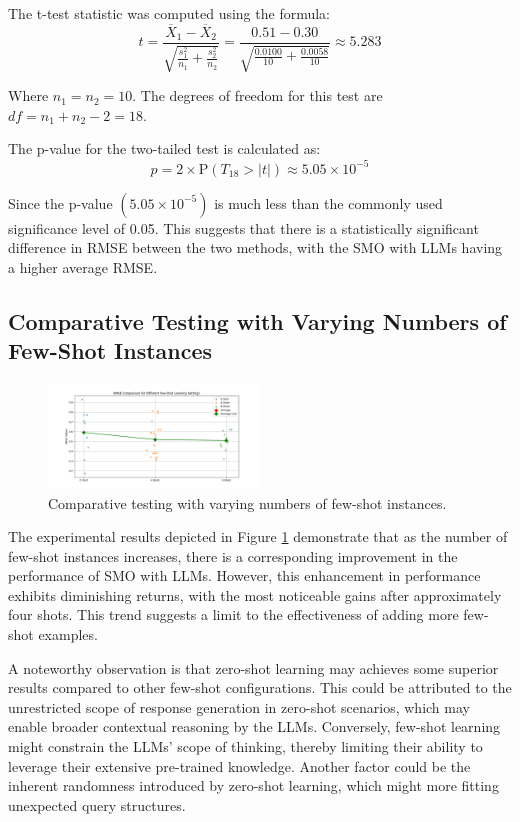 \documentclass{ieeeaccess}
\begin{document}
The t-test statistic was computed using the formula:
\[
t = \frac{\overline{X}_1 - \overline{X}_2}{\sqrt{\frac{s_1^2}{n_1} + \frac{s_2^2}{n_2}}} = \frac{0.51 - 0.30}{\sqrt{\frac{0.0100}{10} + \frac{0.0058}{10}}} \approx 5.283
\]

Where $n_1 = n_2 = 10$. The degrees of freedom for this test are \(df = n_1 + n_2 - 2 = 18\).

The p-value for the two-tailed test is calculated as:
\[
p = 2 \times \text{P}(T_{18} > |t|) \approx 5.05 \times 10^{-5}
\]

Since the p-value \((5.05 \times 10^{-5})\) is much less than the commonly used significance level of 0.05. This suggests that there is a statistically significant difference in RMSE between the two methods, with the SMO with LLMs having a higher average RMSE.

\subsection{Comparative Testing with Varying Numbers of Few-Shot Instances}

\begin{figure}
\centering
\includegraphics[page=1,width=0.5\textwidth]{few_shots.png}
\caption{Comparative testing with varying numbers of few-shot instances. \label{fig.6}}
\end{figure}

The experimental results depicted in Figure \ref{fig.6} demonstrate that as the number of few-shot instances increases, there is a corresponding improvement in the performance of SMO with LLMs. However, this enhancement in performance exhibits diminishing returns, with the most noticeable gains after approximately four shots. This trend suggests a limit to the effectiveness of adding more few-shot examples.

A noteworthy observation is that zero-shot learning may achieves some superior results compared to other few-shot configurations. This could be attributed to the unrestricted scope of response generation in zero-shot scenarios, which may enable broader contextual reasoning by the LLMs. Conversely, few-shot learning might constrain the LLMs' scope of thinking, thereby limiting their ability to leverage their extensive pre-trained knowledge. Another factor could be the inherent randomness introduced by zero-shot learning, which might more fitting unexpected query structures.
\end{document}
